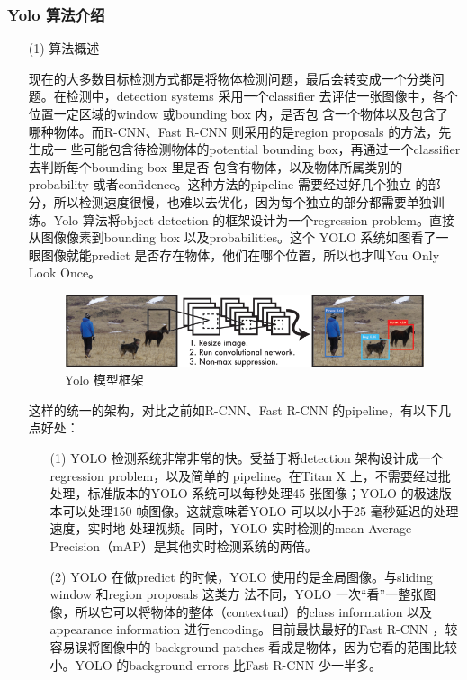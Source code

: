 \subsubsection{Yolo 算法介绍}
\begin{enumerate}
	\item[(1)] 算法概述

	现在的大多数目标检测方式都是将物体检测问题，最后会转变成一个分类问题。在检测中，detection
	systems 采用一个classifier 去评估一张图像中，各个位置一定区域的window 或bounding box 内，是否包
	含一个物体以及包含了哪种物体。而R-CNN、Fast R-CNN 则采用的是region proposals 的方法，先生成一
	些可能包含待检测物体的potential bounding box，再通过一个classifier 去判断每个bounding box 里是否
	包含有物体，以及物体所属类别的probability 或者confidence。这种方法的pipeline 需要经过好几个独立
	的部分，所以检测速度很慢，也难以去优化，因为每个独立的部分都需要单独训练。Yolo 算法将object
	detection 的框架设计为一个regression problem。直接从图像像素到bounding box 以及probabilities。这个
	YOLO 系统如图看了一眼图像就能predict 是否存在物体，他们在哪个位置，所以也才叫You Only Look
	Once。
	\begin{figure}[H]
		\centering
		\includegraphics[width=0.8\linewidth]{screenshot009}
		\caption{Yolo 模型框架}
		\label{fig:screenshot009}
	\end{figure}
	
	这样的统一的架构，对比之前如R-CNN、Fast R-CNN 的pipeline，有以下几点好处：
	\begin{enumerate}
		\item[(1)]  YOLO 检测系统非常非常的快。受益于将detection 架构设计成一个regression problem，以及简单的
		pipeline。在Titan X 上，不需要经过批处理，标准版本的YOLO 系统可以每秒处理45 张图像；YOLO
		的极速版本可以处理150 帧图像。这就意味着YOLO 可以以小于25 毫秒延迟的处理速度，实时地
		处理视频。同时，YOLO 实时检测的mean Average Precision（mAP）是其他实时检测系统的两倍。
		
		\item[(2)] YOLO 在做predict 的时候，YOLO 使用的是全局图像。与sliding window 和region proposals 这类方
		法不同，YOLO 一次“看”一整张图像，所以它可以将物体的整体（contextual）的class information
		以及appearance information 进行encoding。目前最快最好的Fast R-CNN ，较容易误将图像中的
		background patches 看成是物体，因为它看的范围比较小。YOLO 的background errors 比Fast R-CNN
		少一半多。
		

\end{enumerate}
\end{enumerate}
